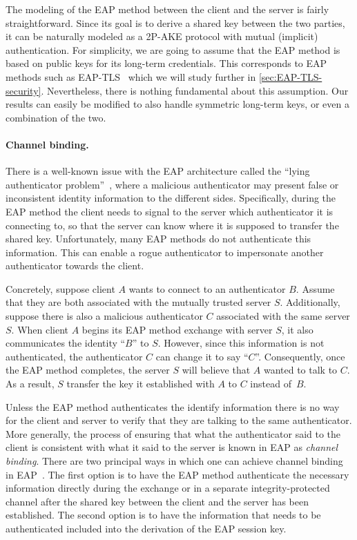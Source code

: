 The modeling of the EAP method between the client and the server is fairly straightforward.
Since its goal is to derive a shared key between the two parties,
it can be naturally modeled as a 2P-AKE protocol with mutual (implicit) authentication.
For simplicity,
we are going to assume that the EAP method is based on public keys for its long-term credentials.
This corresponds to EAP methods such as EAP-TLS~\cite{IETF:RFC5216:EAP-TLS} which we will study further in \cref{sec:EAP-TLS-security}.
Nevertheless,
there is nothing fundamental about this assumption.
Our results can easily be modified to also handle symmetric long-term keys,
or even a combination of the two.


\paragraph{Channel binding.}
There is a well-known issue with the EAP architecture called the ``lying authenticator problem''~\cite[Section~7.15]{IETF:RFC3748:EAP},
where a malicious authenticator may present false or inconsistent identity information to the different sides. 
Specifically,
during the EAP method the client needs to signal to the server which authenticator it is connecting to,
so that the server can know where it is supposed to transfer the shared key.
Unfortunately,
many EAP methods do not authenticate this information.
This can enable a rogue authenticator to impersonate another authenticator towards the client.

Concretely,
suppose client $A$ wants to connect to an authenticator $B$.
Assume that they are both associated with the mutually trusted server $S$.
Additionally,
suppose there is also a malicious authenticator $C$ associated with the same server $S$.
When client $A$ begins its EAP method exchange with server $S$,
it also communicates the identity ``$B$'' to $S$.
However,
since this information is not authenticated,
the authenticator $C$ can change it to say ``$C$''.
Consequently,
once the EAP method completes,
the server $S$ will believe that $A$ wanted to talk to $C$.
As a result,
$S$ transfer the key it established with $A$ to $C$ instead of~$B$.



Unless the EAP method authenticates the identify information there is no way for the client and server to verify that they are talking to the same authenticator.
More generally,
the process of ensuring that what the authenticator said to the client is consistent with what it said to the server is known in EAP as \emph{channel binding}.
There are two principal ways in which one can  achieve channel binding in EAP~\cite[Section~4.1]{IETF:RFC6677:EAP-channel-binding}.
The first option is to have the EAP method authenticate the necessary information directly during the exchange
or in a separate integrity-protected channel after the shared key between the client and the server has been established. 
The second option is to have the information that needs to be authenticated included into the derivation of the EAP session key.

